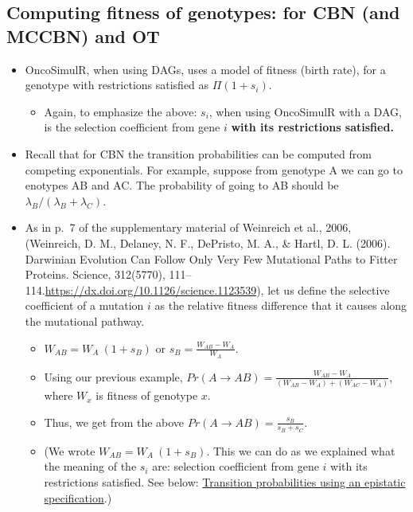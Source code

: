 \documentclass[11pt]{article}
\begin{document}
\subsection{Computing fitness of genotypes: for CBN (and MCCBN) and OT}
\label{sec:org65f3210}
\begin{itemize}
\item OncoSimulR, when using DAGs, uses a model of fitness (birth rate), for a  genotype with restrictions satisfied as \(\Pi (1 + s_i)\). 
\begin{itemize}
\item Again, to emphasize the above: \(s_i\), when using OncoSimulR with a DAG, is  the selection coefficient from gene \(i\) \textbf{with its restrictions satisfied.}
\end{itemize}
\item Recall that for CBN the transition probabilities can be computed from competing   exponentials. For example, suppose from genotype A we can go to enotypes AB and AC. The probability of going to AB should be \(\lambda_B/(\lambda_B +  \lambda_C)\).

  
\item As in p.~7 of the supplementary material of Weinreich et al., 2006, (Weinreich, D. M., Delaney, N. F., DePristo, M. A., \& Hartl, D. L. (2006). Darwinian Evolution Can Follow Only Very Few Mutational Paths to Fitter Proteins. Science, 312(5770), 111–114.\url{https://dx.doi.org/10.1126/science.1123539}), let us define the selective  coefficient of a mutation \(i\) as the relative fitness difference that it causes along the mutational pathway.

  \begin{itemize}
    \item  \(W_{AB} = W_A \  (1 + s_B)\) or \(s_B = \frac{W_{AB} - W_A}{W_A}\). 

    \item Using our previous example, \(Pr(A \rightarrow AB) = \frac{W_{AB}- W_{A}}{(W_{AB} - W_A) + (W_{AC} - W_A)}\), where \(W_x\) is fitness of  genotype \(x\).

    \item Thus, we get from the above \(Pr(A \rightarrow AB) = \frac{s_B}{s_B + s_C}\).
  \item (We wrote \(W_{AB} = W_A \ (1 + s_B)\). This we can do as we explained what the meaning of the \(s_i\) are: selection coefficient from gene \(i\) with its restrictions satisfied. See below: \hyperref[sec:orge68f649]{Transition probabilities using an epistatic specification}.)    
\end{itemize}
      



\end{itemize}
\end{document}
